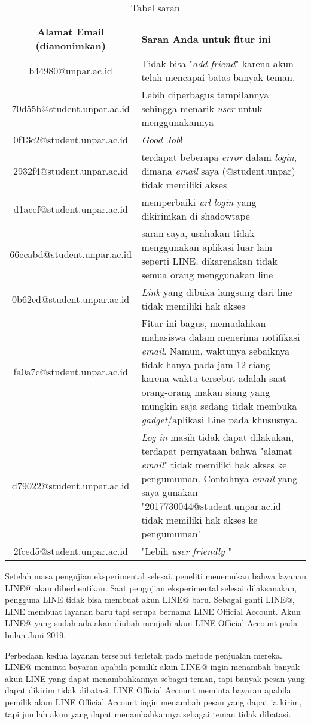\begin{longtable}{|c|p{7cm}|}
	\caption{Tabel saran}
	\label{table:saran} \\
\hline
\hline	\textbf{Alamat Email (dianonimkan)}	&	\centerline{\textbf{Saran Anda untuk fitur ini}}	\\
\hline	b44980@unpar.ac.id	&	Tidak bisa "\textit{add friend}" karena akun telah mencapai batas banyak teman.	\\
\hline	70d55b@student.unpar.ac.id	&	Lebih diperbagus tampilannya sehingga menarik \textit{user} untuk menggunakannya	\\
\hline	0f13c2@student.unpar.ac.id	&	\textit{Good Job}!	\\
\hline	2932f4@student.unpar.ac.id	&	terdapat beberapa \textit{error} dalam \textit{login}, dimana \textit{email} saya (@student.unpar) tidak memiliki akses	\\
\hline	d1acef@student.unpar.ac.id	&	memperbaiki \textit{url login} yang dikirimkan di shadowtape	\\
\hline	66ccabd@student.unpar.ac.id	&	saran saya, usahakan tidak menggunakan aplikasi luar lain seperti LINE. dikarenakan tidak semua orang menggunakan line	\\
\hline	0b62ed@student.unpar.ac.id	&	\textit{Link} yang dibuka langsung dari line tidak memiliki hak akses	\\
\hline	fa0a7c@student.unpar.ac.id	&	Fitur ini bagus, memudahkan mahasiswa dalam menerima notifikasi \textit{email}. Namun, waktunya sebaiknya tidak hanya pada jam 12 siang karena waktu tersebut adalah saat orang-orang makan siang yang mungkin saja sedang tidak membuka \textit{gadget}/aplikasi Line pada khususnya.	\\
\hline	d79022@student.unpar.ac.id	&	\textit{Log in} masih tidak dapat dilakukan, terdapat pernyataan bahwa "alamat \textit{email}" tidak memiliki hak akses ke pengumuman. Contohnya \textit{email} yang saya gunakan "2017730044@student.unpar.ac.id tidak memiliki hak akses ke pengumuman"	\\
\hline	2fced5@student.unpar.ac.id	&	"Lebih \textit{user friendly}
"	\\
\hline
\end{longtable}

Setelah masa pengujian eksperimental selesai, peneliti menemukan bahwa layanan LINE@ akan diberhentikan. Saat pengujian eksperimental selesai dilaksanakan, pengguna LINE tidak bisa membuat akun LINE@ baru. Sebagai ganti LINE@, LINE membuat layanan baru tapi serupa bernama LINE Official Account. Akun LINE@ yang sudah ada akan diubah menjadi akun LINE Official Account pada bulan Juni 2019.

Perbedaan kedua layanan tersebut terletak pada metode penjualan mereka. LINE@ meminta bayaran apabila pemilik akun LINE@ ingin menambah banyak akun LINE yang dapat menambahkannya sebagai teman, tapi banyak pesan yang dapat dikirim tidak dibatasi. LINE Official Account meminta bayaran apabila pemilik akun LINE Official Account ingin menambah pesan yang dapat ia kirim, tapi jumlah akun yang dapat menambahkannya sebagai teman tidak dibatasi.